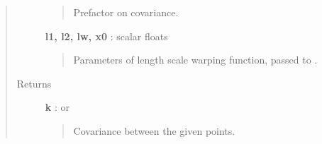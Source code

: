 \documentclass[letterpaper,10pt,english]{sphinxmanual}
\begin{document}
\begin{fulllineitems}
\begin{fulllineitems}
\begin{quote}
\begin{description}
\begin{quote}
Prefactor on covariance.
\end{quote}

\textbf{l1, l2, lw, x0} : scalar floats
\begin{quote}

Parameters of length scale warping function, passed to
.
\end{quote}

\item[{Returns }] \leavevmode
\textbf{k} :  or 
\begin{quote}

Covariance between the given points.
\end{quote}

\end{description}\end{quote}

\end{fulllineitems}


\end{fulllineitems}

\end{document}
